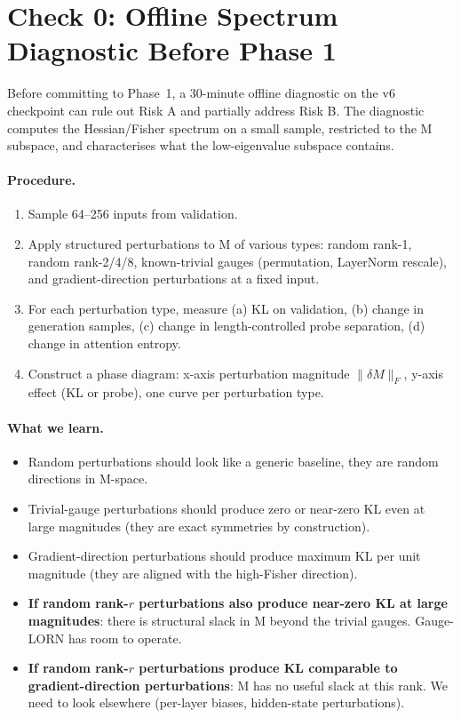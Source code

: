 \documentclass[11pt, a4paper]{article}
\theoremstyle{plain}
\theoremstyle{definition}
\theoremstyle{remark}
\begin{document}
\section{Check 0: Offline Spectrum Diagnostic Before Phase 1}
\label{sec:check-0}

Before committing to Phase~1, a 30-minute offline diagnostic on the v6 checkpoint can rule out Risk A and partially address Risk B.
The diagnostic computes the Hessian/Fisher spectrum on a small sample, restricted to the M subspace, and characterises what the low-eigenvalue subspace contains.

\paragraph{Procedure.}
\begin{enumerate}[nosep]
\item Sample 64--256 inputs from validation.
\item Apply structured perturbations to M of various types: random rank-1, random rank-2/4/8, known-trivial gauges (permutation, LayerNorm rescale), and gradient-direction perturbations at a fixed input.
\item For each perturbation type, measure (a) KL on validation, (b) change in generation samples, (c) change in length-controlled probe separation, (d) change in attention entropy.
\item Construct a phase diagram: x-axis perturbation magnitude $\|\delta M\|_{F}$, y-axis effect (KL or probe), one curve per perturbation type.
\end{enumerate}

\paragraph{What we learn.}
\begin{itemize}[nosep]
\item Random perturbations should look like a generic baseline, they are random directions in M-space.
\item Trivial-gauge perturbations should produce zero or near-zero KL even at large magnitudes (they are exact symmetries by construction).
\item Gradient-direction perturbations should produce maximum KL per unit magnitude (they are aligned with the high-Fisher direction).
\item \textbf{If random rank-$r$ perturbations also produce near-zero KL at large magnitudes}: there is structural slack in M beyond the trivial gauges. Gauge-LORN has room to operate.
\item \textbf{If random rank-$r$ perturbations produce KL comparable to gradient-direction perturbations}: M has no useful slack at this rank. We need to look elsewhere (per-layer biases, hidden-state perturbations).
\end{itemize}
\end{document}

